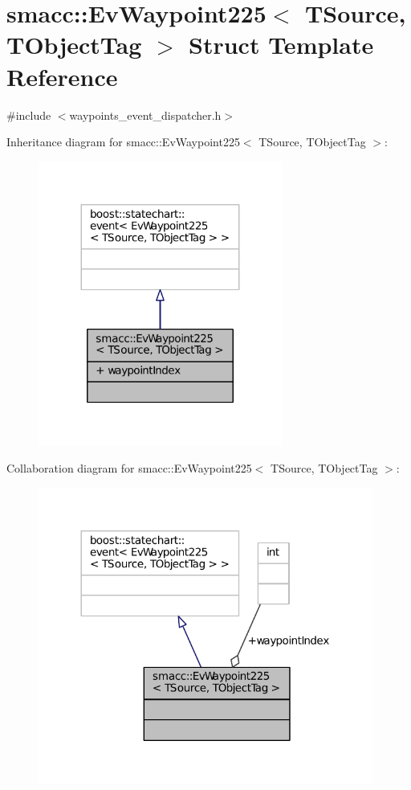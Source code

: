 \hypertarget{structsmacc_1_1EvWaypoint225}{}\section{smacc\+:\+:Ev\+Waypoint225$<$ T\+Source, T\+Object\+Tag $>$ Struct Template Reference}
\label{structsmacc_1_1EvWaypoint225}


{\ttfamily \#include $<$waypoints\+\_\+event\+\_\+dispatcher.\+h$>$}



Inheritance diagram for smacc\+:\+:Ev\+Waypoint225$<$ T\+Source, T\+Object\+Tag $>$\+:
\nopagebreak
\begin{figure}[H]
\begin{center}
\leavevmode
\includegraphics[width=227pt]{structsmacc_1_1EvWaypoint225__inherit__graph}
\end{center}
\end{figure}


Collaboration diagram for smacc\+:\+:Ev\+Waypoint225$<$ T\+Source, T\+Object\+Tag $>$\+:
\nopagebreak
\begin{figure}[H]
\begin{center}
\leavevmode
\includegraphics[width=312pt]{structsmacc_1_1EvWaypoint225__coll__graph}
\end{center}
\end{figure}
